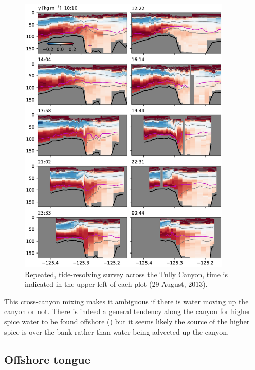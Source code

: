 \documentclass[draft]{agujournal2019}
\begin{document}
\begin{figure}[htbp]
  \begin{center}
    \includegraphics[width=4in]{HydraulicsCanyon}
    \caption{Repeated, tide-resolving survey across the Tully Canyon, time is indicated in the upper left of each plot (29 August, 2013).
      \label{fig:HydraulicsCanyon}
    }
  \end{center}
\end{figure}

This cross-canyon mixing makes it ambiguous if there is water moving up the canyon or not.  There is indeed a general tendency along the canyon for higher spice water to be found offshore () but it seems likely the source of the higher spice is over the bank rather than water being advected up the canyon.

\subsection{Offshore tongue}
\end{document}
